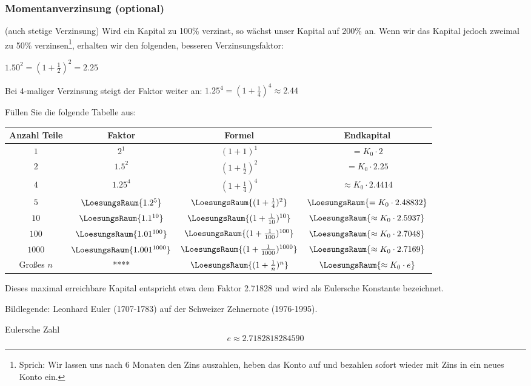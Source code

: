 \newpage

\subsubsection{Momentanverzinsung (optional)}
(auch stetige Verzinsung)
Wird ein Kapital zu 100\% verzinst, so wächst unser Kapital auf 200\%
an. Wenn wir das Kapital jedoch zweimal zu 50\%
verzinsen\footnote{Sprich: Wir lassen uns nach 6 Monaten den Zins
auszahlen, heben das Konto auf und bezahlen sofort wieder mit Zins in
ein neues Konto ein.}, erhalten wir den folgenden, besseren Verzinsungsfaktor:

$1.50^2  = (1 + \frac12)^2 = 2.25$

Bei 4-maliger Verzinsung steigt der Faktor weiter an:
$1.25^4 = (1 + \frac14)^4 \approx 2.44 $

Füllen Sie die folgende Tabelle aus:

\begin{tabular}{c|c|c|c} 
  Anzahl Teile  & Faktor                      & Formel          & Endkapital \\ \hline
  $1$           & $2^1$                      & $(1+1)^1$ & $= K_0 \cdot{} 2 $ \\ \hline
  $2$           & $1.5^2$                      & $(1+\frac12)^2$ & $= K_0 \cdot{} 2.25 $ \\ \hline
  $4$           & $1.25^4$                  & $(1+\frac14)^4$ & $\approx K_0 \cdot{} 2.4414 $ \\ \hline
  $5$           & $\LoesungsRaum{1.2^5}$  & $\LoesungsRaum{(1+\frac14)^2}$ & $\LoesungsRaum{= K_0 \cdot{} 2.48832} $ \\ \hline
  $10$          & $\LoesungsRaum{1.1^{10}}$  & $\LoesungsRaum{(1+\frac{1}{10})^{10}}$ & $\LoesungsRaum{\approx K_0 \cdot{} 2.5937} $ \\ \hline
  $100$         & $\LoesungsRaum{1.01^{100}}$  & $\LoesungsRaum{(1+\frac{1}{100})^{100}}$ & $\LoesungsRaum{\approx K_0 \cdot{} 2.7048 }$ \\ \hline
  $1000$        & $\LoesungsRaum{1.001^{1000}}$  & $\LoesungsRaum{(1+\frac{1}{1000})^{1000}}$ & $\LoesungsRaum{\approx K_0 \cdot{} 2.7169 }$ \\ \hline
  Großes $n$    & ****  & $\LoesungsRaum{(1+\frac{1}{n})^{n}}$ & $\LoesungsRaum{\approx K_0 \cdot{} e }$ \\ \hline
\end{tabular} 

Dieses maximal erreichbare Kapital entspricht etwa dem Faktor 2.71828 und
wird als Eulersche Konstante bezeichnet.

Bildlegende: Leonhard Euler (1707-1783) auf der Schweizer Zehnernote (1976-1995).

\begin{definition}{Eulersche Zahl}{}
$$e \approx 2.7182818284590$$
\end{definition}
\newpage

